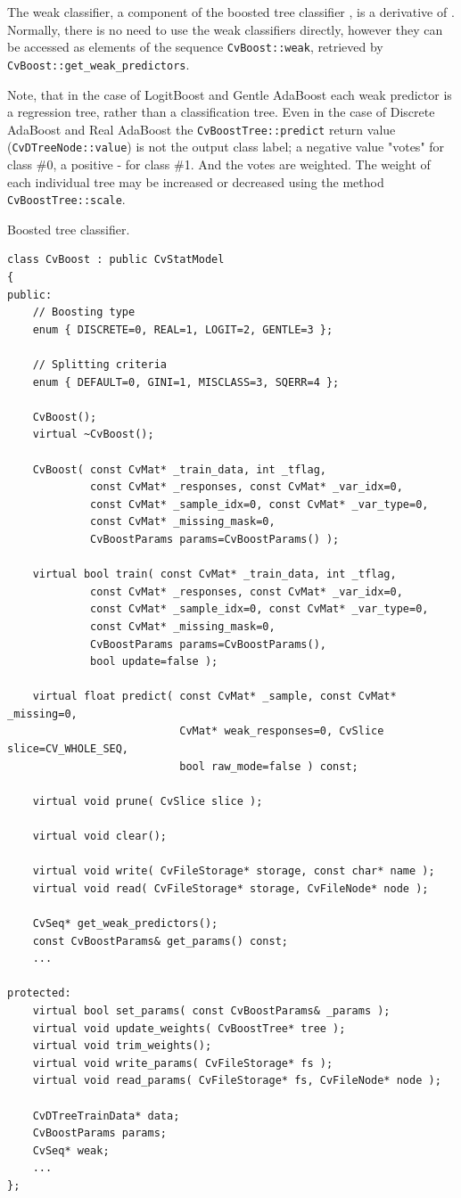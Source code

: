 The weak classifier, a component of the boosted tree classifier , is a derivative of . Normally, there is no need to use the weak classifiers directly, however they can be accessed as elements of the sequence \texttt{CvBoost::weak}, retrieved by \texttt{CvBoost::get\_weak\_predictors}.

Note, that in the case of LogitBoost and Gentle AdaBoost each weak predictor is a regression tree, rather than a classification tree. Even in the case of Discrete AdaBoost and Real AdaBoost the \texttt{CvBoostTree::predict} return value (\texttt{CvDTreeNode::value}) is not the output class label; a negative value "votes" for class \#0, a positive - for class \#1. And the votes are weighted. The weight of each individual tree may be increased or decreased using the method \texttt{CvBoostTree::scale}.


Boosted tree classifier.

\begin{lstlisting}
class CvBoost : public CvStatModel
{
public:
    // Boosting type
    enum { DISCRETE=0, REAL=1, LOGIT=2, GENTLE=3 };

    // Splitting criteria
    enum { DEFAULT=0, GINI=1, MISCLASS=3, SQERR=4 };

    CvBoost();
    virtual ~CvBoost();

    CvBoost( const CvMat* _train_data, int _tflag,
             const CvMat* _responses, const CvMat* _var_idx=0,
             const CvMat* _sample_idx=0, const CvMat* _var_type=0,
             const CvMat* _missing_mask=0,
             CvBoostParams params=CvBoostParams() );

    virtual bool train( const CvMat* _train_data, int _tflag,
             const CvMat* _responses, const CvMat* _var_idx=0,
             const CvMat* _sample_idx=0, const CvMat* _var_type=0,
             const CvMat* _missing_mask=0,
             CvBoostParams params=CvBoostParams(),
             bool update=false );

    virtual float predict( const CvMat* _sample, const CvMat* _missing=0,
                           CvMat* weak_responses=0, CvSlice slice=CV_WHOLE_SEQ,
                           bool raw_mode=false ) const;

    virtual void prune( CvSlice slice );

    virtual void clear();

    virtual void write( CvFileStorage* storage, const char* name );
    virtual void read( CvFileStorage* storage, CvFileNode* node );

    CvSeq* get_weak_predictors();
    const CvBoostParams& get_params() const;
    ...

protected:
    virtual bool set_params( const CvBoostParams& _params );
    virtual void update_weights( CvBoostTree* tree );
    virtual void trim_weights();
    virtual void write_params( CvFileStorage* fs );
    virtual void read_params( CvFileStorage* fs, CvFileNode* node );

    CvDTreeTrainData* data;
    CvBoostParams params;
    CvSeq* weak;
    ...
};
\end{lstlisting}

